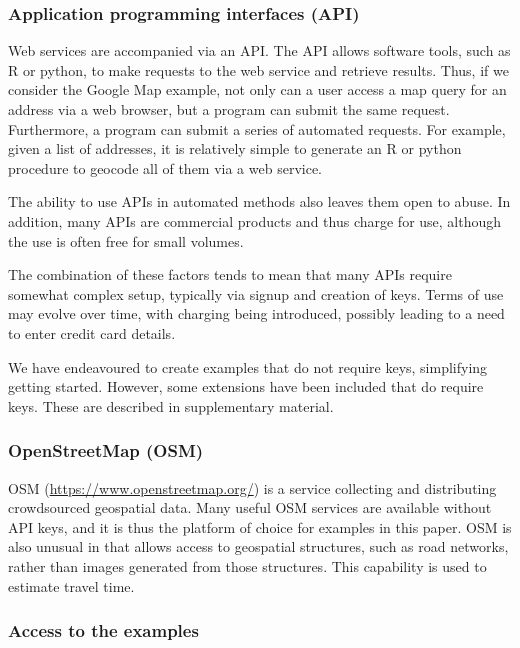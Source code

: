 \documentclass[]{article}
\begin{document}
\hypertarget{application-programming-interfaces-api}{%
\subsubsection{Application programming interfaces
(API)}\label{application-programming-interfaces-api}}

Web services are accompanied via an API. The API allows software tools,
such as R or python, to make requests to the web service and retrieve
results. Thus, if we consider the Google Map example, not only can a
user access a map query for an address via a web browser, but a program
can submit the same request. Furthermore, a program can submit a series
of automated requests. For example, given a list of addresses, it is
relatively simple to generate an R or python procedure to geocode all of
them via a web service.

The ability to use APIs in automated methods also leaves them open to
abuse. In addition, many APIs are commercial products and thus charge
for use, although the use is often free for small volumes.

The combination of these factors tends to mean that many APIs require
somewhat complex setup, typically via signup and creation of keys. Terms
of use may evolve over time, with charging being introduced, possibly
leading to a need to enter credit card details.

We have endeavoured to create examples that do not require keys,
simplifying getting started. However, some extensions have been included
that do require keys. These are described in supplementary material.

\hypertarget{openstreetmap-osm}{%
\subsubsection{OpenStreetMap (OSM)}\label{openstreetmap-osm}}

OSM (\url{https://www.openstreetmap.org/}) is a service collecting and
distributing crowdsourced geospatial data. Many useful OSM services are
available without API keys, and it is thus the platform of choice for
examples in this paper. OSM is also unusual in that allows access to
geospatial structures, such as road networks, rather than images
generated from those structures. This capability is used to estimate
travel time.

\hypertarget{access-to-the-examples}{%
\subsubsection{Access to the examples}\label{access-to-the-examples}}
\end{document}
